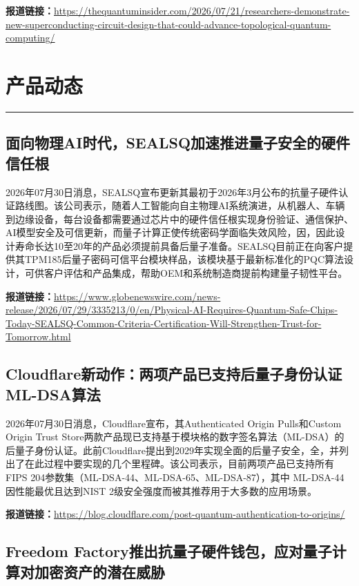 \documentclass[12pt,a4paper]{ctexart}
\begin{document}
\noindent\textbf{报道链接：}\url{https://thequantuminsider.com/2026/07/21/researchers-demonstrate-new-superconducting-circuit-design-that-could-advance-topological-quantum-computing/}


\newpage
\section{产品动态}
\vspace{-0.5em}
\noindent\rule{\linewidth}{1.5pt}

\subsection{ 面向物理AI时代，SEALSQ加速推进量子安全的硬件信任根 }

2026年07月30日消息，SEALSQ宣布更新其最初于2026年3月公布的抗量子硬件认证路线图。该公司表示，随着人工智能向自主物理AI系统演进，从机器人、车辆到边缘设备，每台设备都需要通过芯片中的硬件信任根实现身份验证、通信保护、AI模型安全及可信更新，而量子计算正使传统密码学面临失效风险，因，因此设计寿命长达10至20年的产品必须提前具备后量子准备。SEALSQ目前正在向客户提供其TPM185后量子密码可信平台模块样品，该模块基于最新标准化的PQC算法设计，可供客户评估和产品集成，帮助OEM和系统制造商提前构建量子韧性平台。

\noindent\textbf{报道链接：}\url{https://www.globenewswire.com/news-release/2026/07/29/3335213/0/en/Physical-AI-Requires-Quantum-Safe-Chips-Today-SEALSQ-Common-Criteria-Certification-Will-Strengthen-Trust-for-Tomorrow.html}

\subsection{ Cloudflare新动作：两项产品已支持后量子身份认证ML-DSA算法 }

2026年07月30日消息，Cloudflare宣布，其Authenticated Origin Pulls和Custom Origin Trust Store两款产品现已支持基于模块格的数字签名算法（ML-DSA）的后量子身份认证。此前Cloudflare提出到2029年实现全面的后量子安全，全，并列出了在此过程中要实现的几个里程碑。该公司表示，目前两项产品已支持所有FIPS 204参数集（ML-DSA-44、ML-DSA-65、ML-DSA-87），其中 ML-DSA-44因性能最优且达到NIST 2级安全强度而被其推荐用于大多数的应用场景。

\noindent\textbf{报道链接：}\url{https://blog.cloudflare.com/post-quantum-authentication-to-origins/}

\subsection{ Freedom Factory推出抗量子硬件钱包，应对量子计算对加密资产的潜在威胁 }
\end{document}
